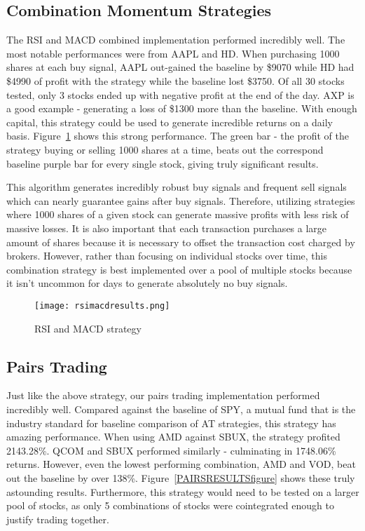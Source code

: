 \documentclass[../thesis.tex]{subfiles}
\begin{document}
\subsection{Combination Momentum Strategies}

The RSI and MACD combined implementation performed incredibly well. The most notable performances were from AAPL and HD. When purchasing 1000 shares at each buy signal, AAPL out-gained the baseline by \$9070  while HD had \$4990 of profit with the strategy while the baseline lost \$3750. Of all 30 stocks tested, only 3 stocks ended up with negative profit at the end of the day. AXP is a good example - generating a loss of \$1300 more than the baseline. With enough capital, this strategy could be used to generate incredible returns on a daily basis. Figure~\ref{RSIMACDRESULTSfigure} shows this strong performance. The green bar - the profit of the strategy buying or selling 1000 shares at a time, beats out the correspond baseline purple bar for every single stock, giving truly significant results. 

This algorithm generates incredibly robust buy signals and frequent sell signals which can nearly guarantee gains after buy signals. Therefore, utilizing strategies where 1000 shares of a given stock can generate massive profits with less risk of massive losses. It is also important that each transaction purchases a large amount of shares because it is necessary to offset the transaction cost charged by brokers. However, rather than focusing on individual stocks over time, this combination strategy is best implemented over a pool of multiple stocks because it isn't uncommon for days to generate absolutely no buy signals.

\begin{figure}[h]
\centering
\texttt{[image: rsimacdresults.png]}
\caption{RSI and MACD strategy   \label{overflow}}
\label{RSIMACDRESULTSfigure}
\end{figure} 

\subsection{Pairs Trading}

Just like the above strategy, our pairs trading implementation performed incredibly well. Compared against the baseline of SPY, a mutual fund that is the industry standard for baseline comparison of AT strategies, this strategy has amazing performance. When using AMD against SBUX, the strategy profited 2143.28\%. QCOM and SBUX performed similarly - culminating in 1748.06\% returns. However, even the lowest performing combination, AMD and VOD, beat out the baseline by over 138\%. Figure~\ref{PAIRSRESULTSfigure} shows these truly astounding results. Furthermore, this strategy would need to be tested on a larger pool of stocks, as only 5 combinations of stocks were cointegrated enough to justify trading together. 
\end{document}
